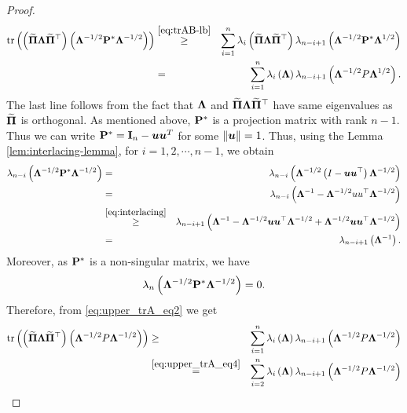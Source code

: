 \documentclass[numsec,webpdf,modern,medium,namedate]{oup-authoring-template}
\theoremstyle{thmstyleone}%
\theoremstyle{thmstyletwo}%
\theoremstyle{thmstylethree}%
\begin{document}
\begin{proof}
    \begin{eqnarray}
        \mathrm{tr} \left( \left( \widetilde{{\boldsymbol{\Pi}}} \boldsymbol{\Lambda} \widetilde{{\boldsymbol{\Pi}}}^\top \right) \left( \boldsymbol{\Lambda}^{-1/2} \mathbf{P}^\ast \boldsymbol{\Lambda}^{-1/2} \right) \right) & \overset{\eqref{eq:trAB-lb}}{\geq} & \sum_{i = 1}^n \lambda_i \left( \widetilde{{\boldsymbol{\Pi}}} \boldsymbol{\Lambda} \widetilde{{\boldsymbol{\Pi}}}^\top \right) \lambda_{n - i + 1} \left( \boldsymbol{\Lambda}^{-1/2} \mathbf{P}^\ast \boldsymbol{\Lambda}^{1/2} \right) \notag \\
        & = & \sum_{i = 1}^n \lambda_i \left( \boldsymbol{\Lambda} \right) \lambda_{n - i + 1} \left( \boldsymbol{\Lambda}^{-1/2} P \boldsymbol{\Lambda}^{1/2} \right). \label{eq:upper_trA_eq2}
    \end{eqnarray}
    The last line follows from the fact that $\boldsymbol{\Lambda}$ and $\widetilde{{\boldsymbol{\Pi}}} \boldsymbol{\Lambda} \widetilde{{\boldsymbol{\Pi}}}^\top$ have same eigenvalues as $\widetilde{{\boldsymbol{\Pi}}}$ is orthogonal. As mentioned above, $\mathbf{P}^\ast$ is a projection matrix with rank $n-1$. Thus we can write $\mathbf{P}^\ast = \mathbf{I}_n - \boldsymbol{u}\boldsymbol{u}^T$ for some $\| \boldsymbol{u} \| = 1$. Thus, using the Lemma \ref{lem:interlacing-lemma}, for $i = 1, 2, \cdots, n-1$, we obtain
    \begin{eqnarray}
        \lambda_{n-i} \left( \boldsymbol{\Lambda}^{-1/2} \mathbf{P}^\ast \boldsymbol{\Lambda}^{-1/2} \right) & = & \lambda_{n - i} \left( \boldsymbol{\Lambda}^{-1/2} \left( I - \boldsymbol{u}\boldsymbol{u}^\top \right) \boldsymbol{\Lambda}^{-1/2} \right) \notag \\
        & = & \lambda_{n- i} \left( \boldsymbol{\Lambda}^{-1} - \boldsymbol{\Lambda}^{-1/2} uu^\top \boldsymbol{\Lambda}^{-1/2} \right)  \notag \\
        & \overset{\eqref{eq:interlacing}}{\geq} & \lambda_{n - i + 1} \left( \boldsymbol{\Lambda}^{-1} - \boldsymbol{\Lambda}^{-1/2} \boldsymbol{u}\boldsymbol{u}^\top \boldsymbol{\Lambda}^{-1/2} + \boldsymbol{\Lambda}^{-1/2} \boldsymbol{u}\boldsymbol{u}^\top \boldsymbol{\Lambda}^{-1/2} \right) \notag \\
        & = & \lambda_{n - i + 1} \left( \boldsymbol{\Lambda}^{-1}  \right). \label{eq:upper_trA_eq3}
    \end{eqnarray}
    Moreover, as $\mathbf{P}^\ast$ is a non-singular matrix, we have
    \begin{equation}\label{eq:upper_trA_eq4}
        \lambda_{n} \left( \boldsymbol{\Lambda}^{-1/2} \mathbf{P}^\ast \boldsymbol{\Lambda}^{-1/2} \right) = 0.
    \end{equation}
    Therefore, from \eqref{eq:upper_trA_eq2} we get
    \begin{eqnarray}
        \tr \left( \left( \widetilde{{\bPi}} \bLam \widetilde{{\bPi}}^\top \right) \left( \bLam^{-1/2} P \bLam^{-1/2} \right) \right) & \geq & \sum_{i = 1}^n \lambda_i \left( \bLam \right) \lambda_{n - i + 1} \left( \bLam^{-1/2} P \bLam^{-1/2} \right) \notag \\
        & \overset{\eqref{eq:upper_trA_eq4}}{=} & \sum_{i = 2}^n \lambda_i \left( \bLam \right) \lambda_{n - i + 1} \left( \bLam^{-1/2} P \bLam^{-1/2} \right) \notag \\

\end{eqnarray}
\end{proof}
\end{document}
